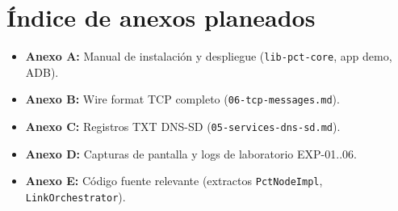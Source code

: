 %
% 
% 
% 

\section*{Índice de anexos planeados}

\begin{itemize}
  \item \textbf{Anexo A:} Manual de instalación y despliegue (\texttt{lib-pct-core}, app demo, ADB).
  \item \textbf{Anexo B:} Wire format TCP completo (\texttt{06-tcp-messages.md}).
  \item \textbf{Anexo C:} Registros TXT DNS-SD (\texttt{05-services-dns-sd.md}).
  \item \textbf{Anexo D:} Capturas de pantalla y logs de laboratorio EXP-01..06.
  \item \textbf{Anexo E:} Código fuente relevante (extractos \texttt{PctNodeImpl}, \texttt{LinkOrchestrator}).
\end{itemize}
